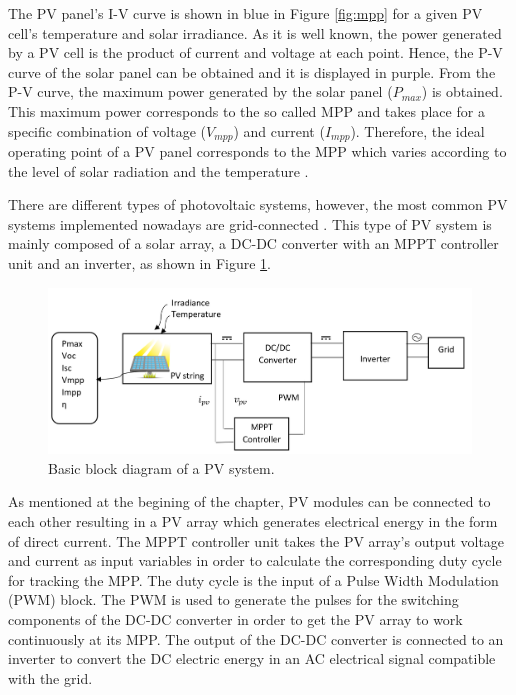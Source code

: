 The PV panel's I-V curve is shown in blue in Figure \ref{fig:mpp}
 for a given PV cell's temperature and solar irradiance. As it is well known, the power generated by a PV cell is the product of current and voltage at each point. Hence, the P-V curve of the solar panel can be obtained and it is displayed in purple. From the P-V curve, the maximum power generated by the solar panel ($P_{max}$) is obtained. This maximum power corresponds to the so called MPP and takes place for a specific combination of voltage ($V_{mpp}$) and current ($I_{mpp}$). Therefore, the ideal operating point of a PV panel corresponds to the MPP which varies according to the level of solar radiation and the temperature \cite{handbook}. 

There are different types of photovoltaic systems, however, the most common PV systems implemented nowadays are grid-connected \cite{handbook}. This type of PV system is mainly composed of a solar array, a DC-DC converter with an MPPT controller unit and an inverter, as shown in Figure \ref{fig:PVsystemblocks}. 

\begin{figure}[htbp]
	\includegraphics[width=\linewidth]{../Pictures/PV_system_blocks}
	\caption{Basic block diagram of a PV system.}
	\label{fig:PVsystemblocks}
\end{figure}

As mentioned at the begining of the chapter, PV modules can be connected to each other resulting in a PV array which generates electrical energy in the form of direct current. The MPPT controller unit takes the PV array's output voltage and current as input variables in order to calculate the corresponding duty cycle for tracking the MPP. The duty cycle is the input of a Pulse Width Modulation (PWM) block. The PWM is used to generate the pulses for the switching components of the DC-DC converter in order to get the PV array to work continuously at its MPP. The output of the DC-DC converter is connected to an inverter to convert the DC electric energy in an AC electrical signal compatible with the grid.\cite{handbook}

